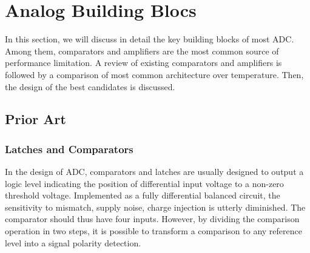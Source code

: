 \chapter{Analog Building Blocs}
\label{sec:analog-building-bloc}

\ifpdf
    \graphicspath{{Chapter7/Figs/Raster/}{Chapter7/Figs/PDF/}{Chapter4/Figs/}}
\else
    \graphicspath{{Chapter7/Figs/Vector/}{Chapter7/Figs/}}
\fi 

In this section, we will discuss in detail the key building blocks of most ADC\@. Among them, comparators and amplifiers are the most common source of performance limitation.
A review of existing comparators and amplifiers is followed by a comparison of most common architecture over temperature. Then, the design of the best candidates is discussed.

\section{Prior Art}                              %
    \subsection{Latches and Comparators}         %
    \label{sec:latches}
In the design of ADC, comparators and latches are usually designed to output a logic level indicating the position of differential input voltage to a non-zero threshold voltage. Implemented as a fully differential balanced circuit, the sensitivity to mismatch, supply noise, charge injection is utterly diminished. The comparator should thus have four inputs. However, by dividing the comparison operation in two steps, it is possible to transform a comparison to any reference level into a signal polarity detection.

